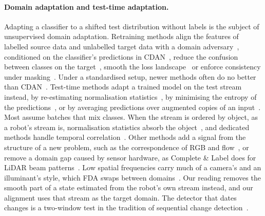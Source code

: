 \paragraph{Domain adaptation and test-time adaptation.}
Adapting a classifier to a shifted test distribution without labels is the subject of unsupervised domain adaptation. Retraining methods align the features of labelled source data and unlabelled target data with a domain adversary~\cite{ganin2016dann}, conditioned on the classifier's predictions in CDAN~\cite{long2018cdan}, reduce the confusion between classes on the target~\cite{jin2020mcc}, smooth the loss landscape~\cite{rangwani2022sdat} or enforce consistency under masking~\cite{hoyer2023mic}. Under a standardised setup, newer methods often do no better than CDAN~\cite{kalluri2024udabench}. Test-time methods adapt a trained model on the test stream instead, by re-estimating normalisation statistics~\cite{li2018adabn}, by minimising the entropy of the predictions~\cite{wang2021tent,niu2023sar,lee2024deyo}, or by averaging predictions over augmented copies of an input~\cite{zhang2022memo}. Most assume batches that mix classes. When the stream is ordered by object, as a robot's stream is, normalisation statistics absorb the object~\cite{burns2021bn}, and dedicated methods handle temporal correlation~\cite{gong2022note,boudiaf2022lame,yuan2023rotta}. Other methods add a signal from the structure of a new problem, such as the correspondence of RGB and flow~\cite{munro2020mmsada}, or remove a domain gap caused by sensor hardware, as Complete \& Label does for LiDAR beam patterns~\cite{yi2021completelabel}. Low spatial frequencies carry much of a camera's and an illuminant's style, which FDA swaps between domains~\cite{fda2020}. Our reading removes the smooth part of a state estimated from the robot's own stream instead, and our alignment uses that stream as the target domain. The detector that dates changes is a two-window test in the tradition of sequential change detection~\cite{page1954cusum}.

